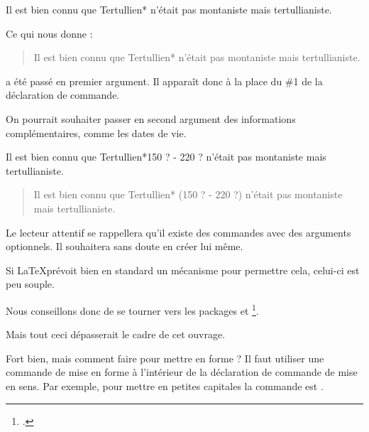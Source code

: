 \begin{latexcode}
\newcommand{\auteur}[1]{#1*}
Il est bien connu que \auteur{Tertullien} n'était pas montaniste
mais tertullianiste.
\end{latexcode}

\newcommand{\auteur}[1]{#1*}

Ce qui nous donne :

\begin{quotation}
Il est bien connu que \auteur{Tertullien} n'était pas montaniste mais tertullianiste.
\end{quotation}


 a été passé en premier argument. Il apparaît donc à la place du \#1 de la déclaration de commande.

On pourrait souhaiter passer en second argument des informations complémentaires, comme les dates de vie.

\begin{latexcode}
\newcommand{\auteur}[2]{#1* (#2)}
Il est bien connu que \auteur{Tertullien}{150 ? - 220 ?}
n'était pas montaniste mais tertullianiste.
\end{latexcode}

\renewcommand{\auteur}[2]{#1* (#2)}

\begin{quotation}
Il est bien connu que \auteur{Tertullien}{150 ? - 220 ?}
n'était pas montaniste mais tertullianiste.
\end{quotation}

\begin{plusloins}
Le lecteur attentif se rappellera qu'il existe des commandes avec des arguments optionnels. Il souhaitera sans doute en créer lui même.

Si \LaTeX prévoit bien en standard un mécanisme pour permettre cela, celui-ci est  peu souple. 

Nous conseillons donc de se tourner vers les packages  et \footcites{xargs}{ifthen}.

Mais tout ceci dépasserait le cadre de cet ouvrage.
\end{plusloins}

Fort bien, mais comment faire pour mettre en forme ? Il faut  utiliser une commande de mise en forme à l'intérieur de la déclaration de commande de mise en sens. Par exemple, pour mettre en petites capitales la commande est .

\begin{latexcode}
\newcommand{\auteur}[2]{\textsc{#1}* (#2)}
\end{latexcode}

